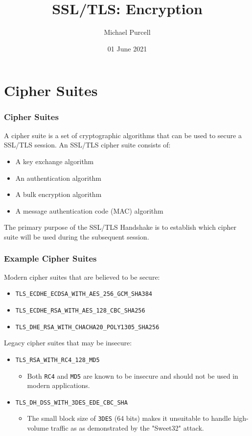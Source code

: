 \documentclass[aspectratio=169]{beamer}
\title{SSL/TLS: Encryption}
\author{Michael Purcell}
\date{01 June 2021}
\begin{document}
\begin{frame}[Triangle=siiorange]
\titlepage
\end{frame}

\section{Cipher Suites}
\begin{frame}[Triangle=siiorange]
	\tocpage
\end{frame}

\begin{frame}[triangle=siiblue]
	\frametitle{Cipher Suites}
	A cipher suite is a set of cryptographic algorithms that can be used to secure a SSL/TLS session. An SSL/TLS cipher suite consists of:
	\begin{itemize}
		\item A key exchange algorithm
		\item An authentication algorithm
		\item A bulk encryption algorithm
		\item A message authentication code (MAC) algorithm
	\end{itemize}
	
	\vfill
	
	The primary purpose of the SSL/TLS Handshake is to establish which cipher suite will be used during the subsequent session.
\end{frame}

\begin{frame}[triangle=siiblue]
	\frametitle{Example Cipher Suites}
	Modern cipher suites that are believed to be secure:
	\begin{itemize}
		\item \texttt{TLS\_ECDHE\_ECDSA\_WITH\_AES\_256\_GCM\_SHA384}
		\item \texttt{TLS\_ECDHE\_RSA\_WITH\_AES\_128\_CBC\_SHA256}
		\item \texttt{TLS\_DHE\_RSA\_WITH\_CHACHA20\_POLY1305\_SHA256}
	\end{itemize}
	
	\vfill
	
	Legacy cipher suites that may be insecure:
	\begin{itemize}		
		\item \texttt{TLS\_RSA\_WITH\_RC4\_128\_MD5}
		\begin{itemize}
			\item Both \texttt{RC4} and \texttt{MD5} are known to be insecure and should not be used in modern applications.
		\end{itemize}
		\item \texttt{TLS\_DH\_DSS\_WITH\_3DES\_EDE\_CBC\_SHA}
		\begin{itemize}
			\item The small block size of \texttt{3DES} (64 bits) makes it unsuitable to handle high-volume traffic as as demonstrated by the "Sweet32" attack.
		\end{itemize}
	\end{itemize}
\end{frame}
\end{document}
